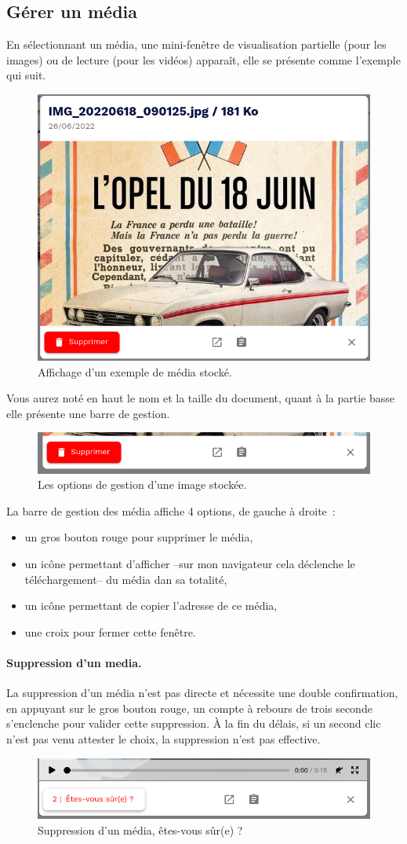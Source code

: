 \subsection{Gérer un média}
En sélectionnant un média, une mini-fenêtre de visualisation partielle (pour les images) ou de lecture (pour les vidéos) apparaît, elle se présente comme l'exemple qui suit.
\begin{figure}
	\centering
	\includegraphics[width=0.500\linewidth]{./Captures/portail.stockage.medias.exemple.seul.png}
	\caption{Affichage d'un exemple de média stocké.}
\end{figure}
Vous aurez noté en haut le nom et la taille du document, quant à la partie basse elle présente une barre de gestion.
\begin{figure}
	\centering
	\includegraphics[width=0.500\linewidth]{./Captures/portail.stockage.medias.barre.gestion.png}
	\caption{Les options de gestion d'une image stockée.}
\end{figure}
La barre de gestion des média affiche 4 options, de gauche à droite~:
\begin{itemize}
	\item un gros bouton rouge pour supprimer le média,
	\item un icône permettant d'afficher --sur mon navigateur cela déclenche le téléchargement-- du média dan sa totalité,
	\item un icône permettant de copier l'adresse de ce média,
	\item une croix pour fermer cette fenêtre.
\end{itemize}

\paragraph{Suppression d'un media.}
La suppression d'un média n'est pas directe et nécessite une double confirmation, en appuyant sur le gros bouton rouge, un compte à rebours de trois seconde s'enclenche pour valider cette suppression. 
À la fin du délais, si un second clic n'est pas venu attester le choix, la suppression n'est pas effective.
\begin{figure}
	\centering
	\includegraphics[width=0.500\linewidth]{./Captures/portail.stockage.medias.suppression.png}
	\caption{Suppression d'un média, êtes-vous sûr(e) ?}
\end{figure}
